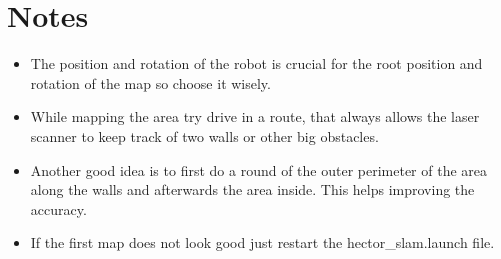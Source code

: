 \documentclass[main.tex]{subfiles}
\begin{document}
	\section{Notes}
	\begin{itemize}
		\item The position and rotation of the robot is crucial for the root position and rotation of the map so choose it wisely.
		\item While mapping the area try drive in a route, that always allows the laser scanner to keep track of two walls or other big obstacles.
		\item Another good idea is to first do a round of the outer perimeter of the area along the walls and afterwards the area inside. This helps improving the accuracy.
		\item If the first map does not look good just restart the hector\_slam.launch file.
	\end{itemize}
	
	
\end{document}
